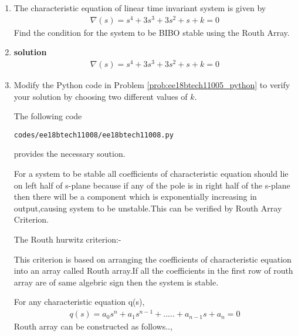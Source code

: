 \begin{enumerate}[label=\thesubsection.\arabic*.,ref=\thesubsection.\theenumi]
\item 
The characteristic equation of linear time invariant system is given by
\begin{align} 
\nabla(s)=s^4+3s^3+3s^2+s+k=0
\end{align}
Find the condition for the system to be BIBO stable using the Routh Array.

\item \textbf{solution}
\begin{align}
\nabla(s)=s^4+3s^3+3s^2+s+k=0
\end{align}

\item Modify the Python code in Problem \ref{prob:ee18btech11005_python} to verify your solution by choosing two different values of $k$.

\solution 
The following code 
%
\begin{lstlisting}
codes/ee18btech11008/ee18btech11008.py
\end{lstlisting}
%
provides the necessary soution.

For a system to be stable all coefficients of characteristic equation should lie on left half of s-plane because if any of the pole is in right half of the s-plane then there will be a component which is exponentially increasing in output,causing system to be unstable.This can be verified by Routh Array Criterion.


The Routh hurwitz criterion:-


This criterion is based on arranging the coefficients of characteristic equation into an array called Routh array.If all the coefficients in the first row of routh array are of same algebric sign then the system is stable.


For any characteristic equation q(s),
\begin{multline}
q(s) = a_0s^n+a_1s^{n-1}+.....+a_{n-1}s+a_n = 0
\end{multline}
Routh array can be constructed as follows..,
 

\end{enumerate}
